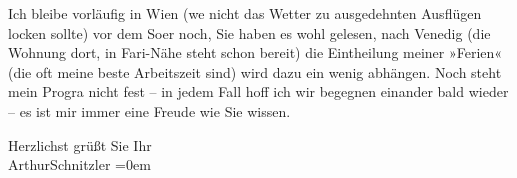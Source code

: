 \pstart
           Ich bleibe vorläufig in Wien (we{\geminationn} nicht das
               Wetter zu ausgedehnten Ausflügen locken sollte) vor dem So{\geminationm}er noch, Sie haben es
               wohl gelesen, \label{K_L03744-11v}\label{K_L03744-11} nach Venedig (die Wohnung dort, in Fari-Nähe steht schon bereit) die Eintheilung
               meiner »Ferien« (die oft meine beste Arbeitszeit sind) wird dazu ein wenig abhängen.
               Noch steht mein Progra{\geminationm} nicht fest – in jedem Fall hoff ich wir begegnen einander
               bald wieder – es ist mir immer eine Freude wie Sie wissen.\pend
           
\pstart
           Herzlichst grüßt Sie Ihr{\\[\baselineskip]}\spacefill\mbox{ArthurSchnitzler}\pend
           \leftskip=0em{}\endnumbering{}
\begin{anhang}
\end{anhang}
      